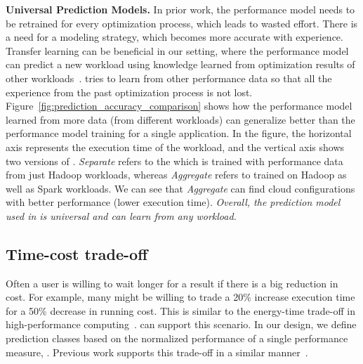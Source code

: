 \textbf{Universal Prediction Models.}
In prior work, the performance model needs to be retrained
for every optimization process, which leads to wasted effort.
There is a need for a modeling strategy, which becomes more accurate with experience. 
Transfer learning can be beneficial in our setting,
where the performance model can predict a new workload
using knowledge learned from optimization results of other workloads~\cite{pan2010survey}.
\scout tries to learn from other performance data so that all the experience from the past optimization process is not lost.
Figure~\ref{fig:prediction_accuracy_comparison} shows
how the performance model learned from more data (from different workloads) can
generalize better than the performance model training for a single application.
In the figure, the horizontal axis represents the execution time of the workload,
and the vertical axis shows two versions of \scout. \emph{Separate}
refers to the \scout which is trained with performance data from just
Hadoop workloads, whereas \emph{Aggregate} refers to \scout trained on Hadoop
as well as Spark workloads. We can see that \emph{Aggregate} can find cloud
configurations with better performance (lower execution time). 
\textit{Overall, the prediction model used in \scout is universal and can learn from any workload.}

\subsection*{Time-cost trade-off}
Often a
user is willing to wait longer for a result if there is a big
reduction in cost.
For example, many might be willing to trade a 20\% increase execution time for a 50\% decrease in running cost.
This is similar to the energy-time trade-off in high-performance computing~\cite{Freeh2007}.
\scout can support this scenario.
In our design, we define prediction classes based on the normalized performance of a single performance measure, .
Previous work supports this trade-off in a similar manner~\cite{Hsu2018Arrow}.


